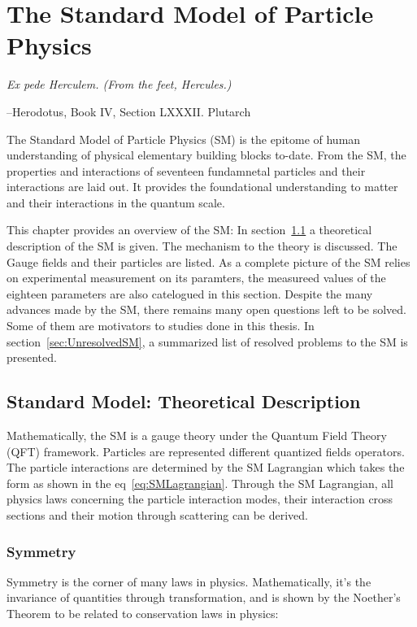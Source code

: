 \chapter{The Standard Model of Particle Physics}
\label{chapter:SM}
	
\epigraph{\textit{Ex pede Herculem. \newline(From the feet, Hercules.)}}{--Herodotus, Book IV, Section LXXXII. Plutarch}

The Standard Model of Particle Physics (SM) is the epitome of human understanding of physical elementary building blocks to-date. From the SM, the properties and interactions of seventeen fundamnetal particles and their interactions are laid out. It provides the foundational understanding to matter and their interactions in the quantum scale.

This chapter provides an overview of the SM: In section~\ref{sec:SM} a theoretical description of the SM is given. The mechanism to the theory is discussed. The Gauge fields and their particles are listed. As a complete picture of the SM relies on experimental measurement on its paramters, the measureed values of the eighteen parameters are also catelogued in this section. Despite the many advances made by the SM, there remains many open
questions left to be solved. Some of them are motivators to studies done in this thesis. In section~\ref{sec:UnresolvedSM}, a summarized list of resolved problems to the SM is presented.

\section{Standard Model: Theoretical Description}
\label{sec:SM}

Mathematically, the SM is a gauge theory under the 
Quantum Field Theory (QFT) framework. Particles are represented different quantized fields operators. The particle interactions are determined by the SM Lagrangian which takes the form as shown in the eq~\ref{eq:SMLagrangian}. Through the SM Lagrangian, all physics laws concerning the particle interaction modes, their interaction cross sections and their motion through scattering can be derived.

\subsection{Symmetry}
Symmetry is the corner of many laws in physics. Mathematically, it's the invariance of quantities through transformation, and is shown by the Noether's Theorem to be related to conservation laws in physics:

